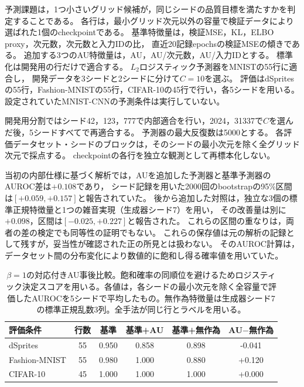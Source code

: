 \documentclass[11pt,a4paper]{ltjsarticle}
\begin{document}
予測課題は，1つ小さいグリッド候補が，同じシードの品質目標を満たすかを判定することである。
各行は，最小グリッド次元以外の容量で検証データにより選ばれた1個のcheckpointである。
基準特徴量は，検証MSE，KL，ELBO proxy，次元数，次元数と入力IDの比，
直近20記録epochsの検証MSEの傾きである。
追加する3つのAU特徴量は，AU，AU/次元数，AU/入力IDとする。
標準化は開発用の行だけで適合する。
$L_2$ロジスティック予測器をMNISTの55行に適合し，
開発データを3シードと2シードに分けて$C=10$を選ぶ。
評価はdSpritesの55行，Fashion-MNISTの55行，CIFAR-10の45行で行い，各5シードを用いる。
設定されていたMNIST-CNNの予測条件は実行していない。

開発用分割ではシード42，123，777で内部適合を行い，2024，31337で$C$を選んだ後，5シードすべてで再適合する。
予測器の最大反復数は5000とする。
各評価データセット・シードのブロックは，そのシードの最小次元を除く全グリッド次元で採点する。
checkpointの各行を独立な観測として再標本化しない。

当初の内部仕様に基づく解析では，AUを追加した予測器と基準予測器のAUROC差は$+0.108$であり，
シード記録を用いた2000回のbootstrapの95\%区間は$[+0.059,+0.157]$と報告されていた。
後から追加した対照は，独立な3個の標準正規特徴量と1つの雑音実現（生成器シード7）を用い，
その改善量は別に$+0.098$，区間は$[-0.025,+0.227]$と報告された。
これらの区間の重なりは，両者の差の検定でも同等性の証明でもない。
これらの保存値は元の解析の記録として残すが，妥当性が確認された正の所見とは扱わない。
そのAUROC計算は，データセット間の分布変化により数値的に飽和し得る確率値を用いていた。

\begin{table}[H]
\caption{$\beta=1$の対応付きAU事後比較。飽和確率の同順位を避けるためロジスティック決定スコアを用いる。各値は，各シードの最小次元を除く全容量で評価したAUROCを5シードで平均したもの。無作為特徴量は生成器シード7の標準正規乱数3列。全手法が同じ行とラベルを用いる。}\label{tab:au}
\footnotesize
\setlength{\tabcolsep}{3.5pt}
\begin{tabular*}{\textwidth}{@{\extracolsep{\fill}}lccccc@{}}
\toprule
評価条件 & 行数 & 基準 & 基準+AU & 基準+無作為 & AU$-$無作為 \\
\midrule
dSprites & 55 & 0.950 & 0.858 & 0.898 & -0.041 \\
Fashion-MNIST & 55 & 0.980 & 1.000 & 0.880 & +0.120 \\
CIFAR-10 & 45 & 1.000 & 1.000 & 1.000 & +0.000 \\
\bottomrule
\end{tabular*}
\end{table}
\end{document}
